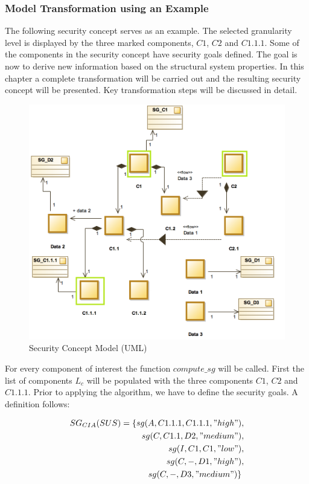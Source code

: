 \subsubsection{Model Transformation using an Example}
\label{subsubsec:transformation_example}
The following security concept serves as an example. The selected granularity level is displayed by the three marked components, $C1$, $C2$ and $C1.1.1$. Some of the components in the security concept have security goals defined. The goal is now to derive new information based on the structural system properties. In this chapter a complete transformation will be carried out and the resulting security concept will be presented. Key transformation steps will be discussed in detail. 

\begin{figure}[H]
        \includegraphics[width=1\linewidth]{pictures/sg_transformation}
    \caption{Security Concept Model (UML)}
\end{figure}

For every component of interest the function $compute\_sg$ will be called. First the list of components $L_c$ will be populated with the three components $C1$, $C2$ and $C1.1.1$. Prior to applying the algorithm, we have to define the security goals. A definition follows:

\begin{align*}
SG_{CIA}(SUS) = \{sg(A,C1.1.1,C1.1.1,"high") &, \\ sg(C,C1.1,D2,"medium")&, \\
sg(I,C1,C1,"low")&, \\
sg(C,-,D1,"high")&, \\
sg(C,-,D3,"medium")\} 
\end{align*}

